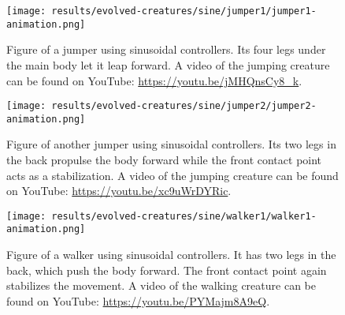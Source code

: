 \documentclass[main]{subfiles}
\begin{document}
\begin{figure}[tb]
\centering
\texttt{[image: results/evolved-creatures/sine/jumper1/jumper1-animation.png]}
\caption[Figure of a jumper using sinusoidal controllers.]{Figure of a jumper using sinusoidal controllers. Its four legs under the main body let it leap forward. A video of the jumping creature can be found on YouTube: \url{https://youtu.be/jMHQnsCy8_k}.}
\label{figure:successfulcreatures-jumper1}
\end{figure}

\begin{figure}[tb]
\centering
\texttt{[image: results/evolved-creatures/sine/jumper2/jumper2-animation.png]}
\caption[Figure of another jumper using sinusoidal controllers.]{Figure of another jumper using sinusoidal controllers. Its two legs in the back propulse the body forward while the front contact point acts as a stabilization. A video of the jumping creature can be found on YouTube: \url{https://youtu.be/xc9uWrDYRic}.}
\label{figure:successfulcreatures-jumper2}
\end{figure}

\begin{figure}[tb]
\centering
\texttt{[image: results/evolved-creatures/sine/walker1/walker1-animation.png]}
\caption[Figure of a walker using sinusoidal controllers.]{Figure of a walker using sinusoidal controllers. It has two legs in the back, which push the body forward. The front contact point again stabilizes the movement. A video of the walking creature can be found on YouTube: \url{https://youtu.be/PYMajm8A9eQ}.}
\label{figure:successfulcreatures-walker1}
\end{figure}
\end{document}
